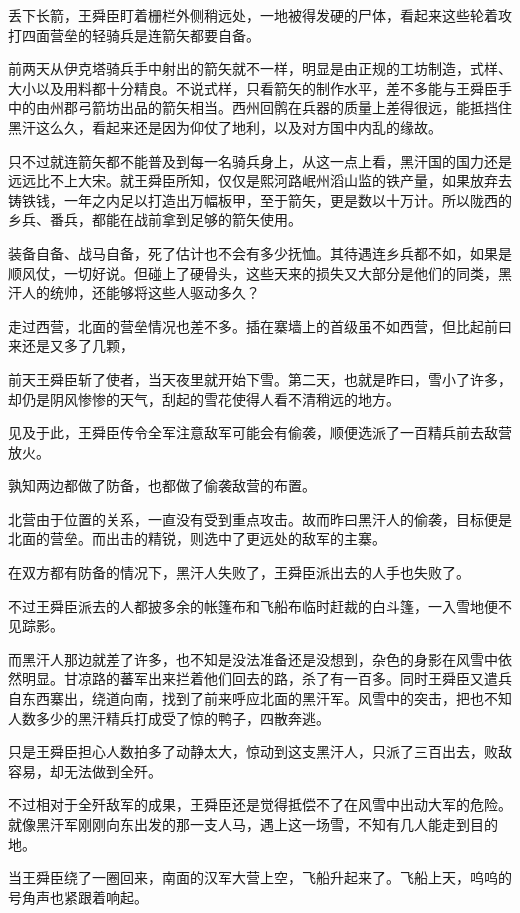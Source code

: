 丢下长箭，王舜臣盯着栅栏外侧稍远处，一地被得发硬的尸体，看起来这些轮着攻打四面营垒的轻骑兵是连箭矢都要自备。

前两天从伊克塔骑兵手中射出的箭矢就不一样，明显是由正规的工坊制造，式样、大小以及用料都十分精良。不说式样，只看箭矢的制作水平，差不多能与王舜臣手中的由州郡弓箭坊出品的箭矢相当。西州回鹘在兵器的质量上差得很远，能抵挡住黑汗这么久，看起来还是因为仰仗了地利，以及对方国中内乱的缘故。

只不过就连箭矢都不能普及到每一名骑兵身上，从这一点上看，黑汗国的国力还是远远比不上大宋。就王舜臣所知，仅仅是熙河路岷州滔山监的铁产量，如果放弃去铸铁钱，一年之内足以打造出万幅板甲，至于箭矢，更是数以十万计。所以陇西的乡兵、番兵，都能在战前拿到足够的箭矢使用。

装备自备、战马自备，死了估计也不会有多少抚恤。其待遇连乡兵都不如，如果是顺风仗，一切好说。但碰上了硬骨头，这些天来的损失又大部分是他们的同类，黑汗人的统帅，还能够将这些人驱动多久？

走过西营，北面的营垒情况也差不多。插在寨墙上的首级虽不如西营，但比起前曰来还是又多了几颗，

前天王舜臣斩了使者，当天夜里就开始下雪。第二天，也就是昨曰，雪小了许多，却仍是阴风惨惨的天气，刮起的雪花使得人看不清稍远的地方。

见及于此，王舜臣传令全军注意敌军可能会有偷袭，顺便选派了一百精兵前去敌营放火。

孰知两边都做了防备，也都做了偷袭敌营的布置。

北营由于位置的关系，一直没有受到重点攻击。故而昨曰黑汗人的偷袭，目标便是北面的营垒。而出击的精锐，则选中了更远处的敌军的主寨。

在双方都有防备的情况下，黑汗人失败了，王舜臣派出去的人手也失败了。

不过王舜臣派去的人都披多余的帐篷布和飞船布临时赶裁的白斗篷，一入雪地便不见踪影。

而黑汗人那边就差了许多，也不知是没法准备还是没想到，杂色的身影在风雪中依然明显。甘凉路的蕃军出来拦着他们回去的路，杀了有一百多。同时王舜臣又遣兵自东西寨出，绕道向南，找到了前来呼应北面的黑汗军。风雪中的突击，把也不知人数多少的黑汗精兵打成受了惊的鸭子，四散奔逃。

只是王舜臣担心人数拍多了动静太大，惊动到这支黑汗人，只派了三百出去，败敌容易，却无法做到全歼。

不过相对于全歼敌军的成果，王舜臣还是觉得抵偿不了在风雪中出动大军的危险。就像黑汗军刚刚向东出发的那一支人马，遇上这一场雪，不知有几人能走到目的地。

当王舜臣绕了一圈回来，南面的汉军大营上空，飞船升起来了。飞船上天，呜呜的号角声也紧跟着响起。

